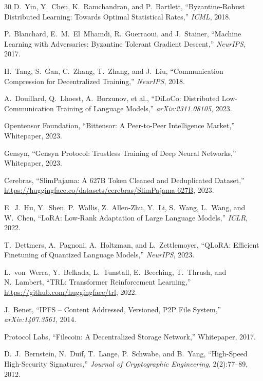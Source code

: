 \documentclass[11pt,letterpaper]{article}
\begin{document}
\begin{thebibliography}{30}
D.~Yin, Y.~Chen, K.~Ramchandran, and P.~Bartlett, ``Byzantine-Robust Distributed Learning: Towards Optimal Statistical Rates,'' \textit{ICML}, 2018.

P.~Blanchard, E.~M.~El~Mhamdi, R.~Guerraoui, and J.~Stainer, ``Machine Learning with Adversaries: Byzantine Tolerant Gradient Descent,'' \textit{NeurIPS}, 2017.

H.~Tang, S.~Gan, C.~Zhang, T.~Zhang, and J.~Liu, ``Communication Compression for Decentralized Training,'' \textit{NeurIPS}, 2018.

A.~Douillard, Q.~Lhoest, A.~Borzunov, et al., ``DiLoCo: Distributed Low-Communication Training of Language Models,'' \textit{arXiv:2311.08105}, 2023.

Opentensor Foundation, ``Bittensor: A Peer-to-Peer Intelligence Market,'' Whitepaper, 2023.

Gensyn, ``Gensyn Protocol: Trustless Training of Deep Neural Networks,'' Whitepaper, 2023.

Cerebras, ``SlimPajama: A 627B Token Cleaned and Deduplicated Dataset,'' \url{https://huggingface.co/datasets/cerebras/SlimPajama-627B}, 2023.

E.~J.~Hu, Y.~Shen, P.~Wallis, Z.~Allen-Zhu, Y.~Li, S.~Wang, L.~Wang, and W.~Chen, ``LoRA: Low-Rank Adaptation of Large Language Models,'' \textit{ICLR}, 2022.

T.~Dettmers, A.~Pagnoni, A.~Holtzman, and L.~Zettlemoyer, ``QLoRA: Efficient Finetuning of Quantized Language Models,'' \textit{NeurIPS}, 2023.

L.~von~Werra, Y.~Belkada, L.~Tunstall, E.~Beeching, T.~Thrush, and N.~Lambert, ``TRL: Transformer Reinforcement Learning,'' \url{https://github.com/huggingface/trl}, 2022.

J.~Benet, ``IPFS -- Content Addressed, Versioned, P2P File System,'' \textit{arXiv:1407.3561}, 2014.

Protocol Labs, ``Filecoin: A Decentralized Storage Network,'' Whitepaper, 2017.

D.~J.~Bernstein, N.~Duif, T.~Lange, P.~Schwabe, and B.~Yang, ``High-Speed High-Security Signatures,'' \textit{Journal of Cryptographic Engineering}, 2(2):77--89, 2012.


\end{thebibliography}
\end{document}
